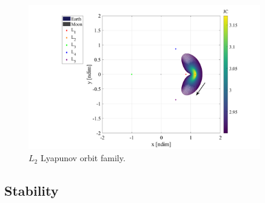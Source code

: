 \begin{figure}[ht]
    \centering
    \includegraphics[width=0.9\textwidth]{figures/L2LyapunovFamily.pdf}
    \caption{$L_{2}$ Lyapunov orbit family.}
    \label{fig:L2Lyapunov}
\end{figure}

\subsection{Stability}

